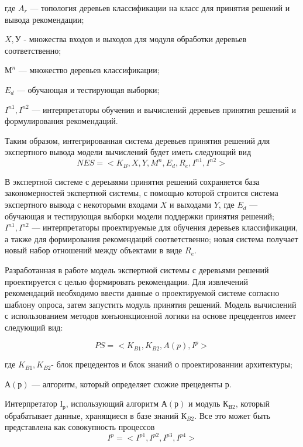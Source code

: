 где $A_r$ — топология деревьев классификации на класс для принятия решений и вывода рекомендации; 

$X, У$ - множества входов и выходов для модуля обработки деревьев соответственно; 

$М^n$ — множество деревьев классификации; 

$E_d$ — обучающая и тестирующая выборки; 

$I^{n1}, I^{n2}$ — интерпретаторы обучения и вычислений деревьев принятия решений и формулирования рекомендаций.

Таким образом, интегрированная система деревьев  принятия решений для экспертного вывода модели вычислений будет иметь следующий вид
\begin{equation}
    \label{eq:equation32}
    NES=<K_B,X,Y,M^n,E_d,R_e, I^{n1}, I^{n2} >
\end{equation}

В экспертной системе с дереьвями принятия решений сохраняется база закономерностей экспертной системы, с помощью которой строится система экспертного вывода с некоторыми входами $X$ и выходами $Y$, где $E_d$ — обучающая и тестирующая выборки модели поддержки принятия решений;  $I^{n1}, I^{n2}$ — интерпретаторы проектируемые для обучения деревьев классификации, а также для формирования рекомендаций соответственно; новая система получает новый набор отношений между объектами в виде $R_e$.

Разработанная в работе модель экспертной системы с деревьями решений проектируется с целью формировать рекомендации. Для извлечений рекомендаций необходимо ввести данные о проектируемой системе согласно шаблону опроса, затем запустить модуль принятия решений. 
Модель вычислений с использованием методов конъюнкционной логики на основе прецедентов имеет следующий вид:

\begin{equation}
    \label{eq:equation33}
    PS=<K_{B1},K_{B2},A(p), I^p >
\end{equation}

где $K_{B1},K_{B2}$- блок прецедентов и блок знаний о проектированнии архитектуры; 

$А(р)$ — алгоритм, который определяет схожие прецеденты р.

Интерпретатор $І_р$, использующий алгоритм $А(р)$ и модуль $К_{В2}$, который обрабатывает данные, хранящиеся в базе знаний $К_{B2}$. Все это может быть представлена как совокупность процессов
\begin{equation}
    \label{eq:equation34}
    I^p = <I^{p1}, I^{p2}, I^{p3}, I^{p4}>
\end{equation}

